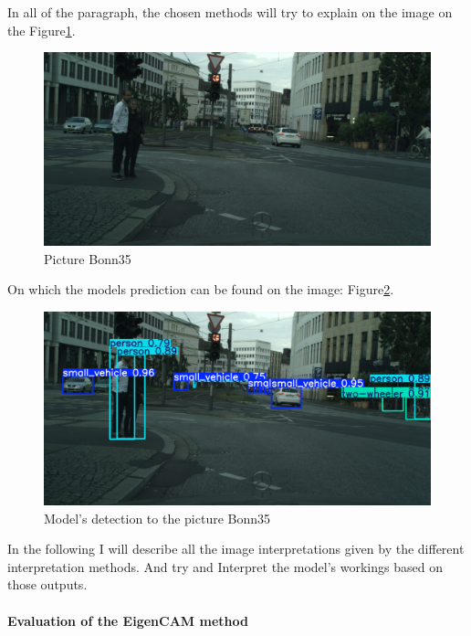 In all of the paragraph, the chosen methods will try to explain on the image on the Figure\ref{fig:bonn35}.
\begin{figure}[h]
    \centering
    \includegraphics[width=1\linewidth]{figures/bonn_000035_000019_leftImg8bit_original}
    \caption{Picture Bonn35 }
    \label{fig:bonn35}
\end{figure}

On which the models prediction can be found on the image: Figure\ref{fig:detbonn35}.
\begin{figure}[h]
    \centering
    \includegraphics[width=1\linewidth]{figures/bonn_000035_000019_leftImg8bit}
    \caption{Model's detection to the picture Bonn35 }
    \label{fig:detbonn35}
\end{figure}

In the following I will describe all the image interpretations given by the different interpretation methods. And try and Interpret the model's workings based on those outputs.



\paragraph{Evaluation of the EigenCAM method}\label{par:evaluation-of-the-eigencam-method}

